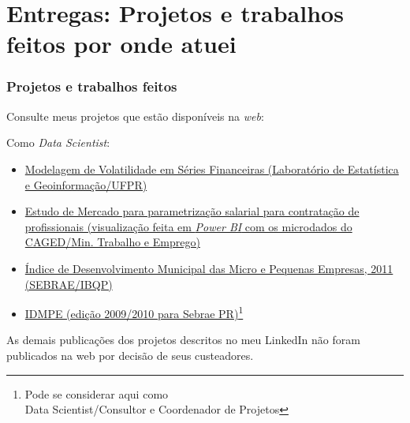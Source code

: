\documentclass{beamer}
\begin{document}
\section{Entregas: Projetos e trabalhos feitos por onde atuei}
\begin{frame}
\frametitle{Projetos e trabalhos feitos}

\footnotesize
Consulte meus projetos que estão disponíveis na \textit{web}:

Como \textit{Data Scientist}:

\begin{itemize}
    \item<1-4> \textcolor{blue}{\href{http://www.leg.ufpr.br/doku.php/projetos:ehlers:volprev}{Modelagem de Volatilidade em Séries Financeiras (Laboratório de Estatística e Geoinformação/UFPR)}} 
    
    \item<2-4> \textcolor{blue}{\href{https://rhoportolio.blogspot.com/2019/09/salarios-de-admissao-por-cargo.html}{Estudo de Mercado para parametrização salarial para contratação de profissionais (visualização feita em \textit{Power BI} com os microdados do CAGED/Min. Trabalho e Emprego)}} 
    
    \item<3-4> \textcolor{blue}{\href{http://sites.pr.sebrae.com.br/leigeral/wp-content/uploads/sites/35/2014/02/Cartilha_IDMPE_PR_-_junho_2011.pdf}{Índice de Desenvolvimento Municipal das Micro e Pequenas Empresas, 2011 (SEBRAE/IBQP)}}\label{idmpe}
    \item<4-4> \textcolor{blue}{\href{http://sites.pr.sebrae.com.br/leigeral/wp-content/uploads/sites/35/2014/09/IDME_2013_web.pdf}{IDMPE (edição 2009/2010 para Sebrae PR)\footnote{\tiny Pode se considerar aqui como \\ Data Scientist/Consultor e Coordenador de Projetos} }}
\end{itemize}

\pause *As demais publicações dos projetos descritos no meu LinkedIn não foram publicados na web por decisão de seus custeadores.

\end{frame}
\end{document}
